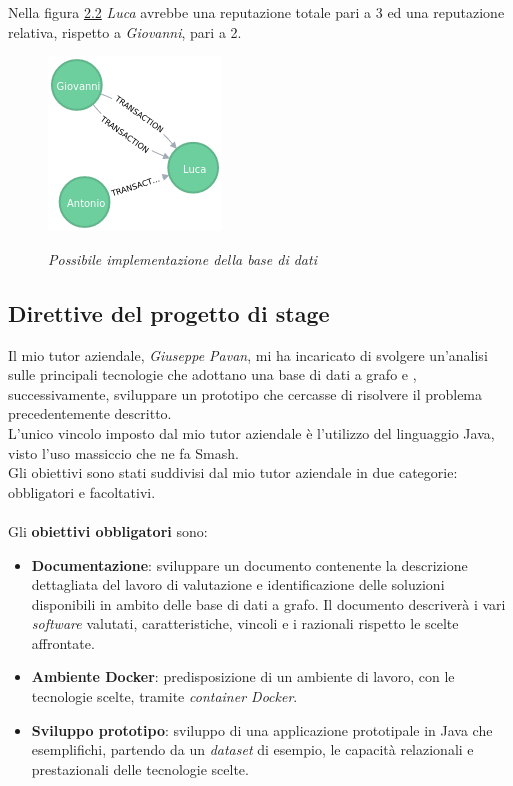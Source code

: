 Nella figura \hyperref[fig:figura 2.2]{2.2} \textit{Luca} avrebbe una reputazione totale pari a 3 ed una reputazione relativa, rispetto a \textit{Giovanni}, pari a 2.
\begin{figure}[h!]
	\centering
	\includegraphics[scale=0.8]{immagini/grafo1.png}
	\label{fig:figura 2.2}
	\caption{\textit{Possibile implementazione della base di dati}}
\end{figure}
\label{sec:pianodl}
\subsection{Direttive del progetto di stage}
Il mio tutor aziendale, \textit{Giuseppe Pavan}, mi ha incaricato di svolgere un'analisi sulle principali tecnologie che adottano una base di dati a grafo e , successivamente, sviluppare un prototipo che cercasse di risolvere il problema precedentemente descritto.\\
L'unico vincolo imposto dal mio tutor aziendale è l'utilizzo del linguaggio Java, visto l'uso massiccio che ne fa Smash\textregistered.\\
Gli obiettivi sono stati suddivisi dal mio tutor aziendale in due categorie: obbligatori e facoltativi.\\
\\
Gli \textbf{obiettivi obbligatori} sono:
\begin{itemize}
\item{\textbf{Documentazione}:} sviluppare un documento contenente la descrizione dettagliata del lavoro di valutazione e identificazione delle soluzioni disponibili in ambito delle base di dati a grafo. Il documento descriverà i vari \textit{software} valutati, caratteristiche, vincoli e i razionali rispetto le scelte affrontate.
\item{\textbf{Ambiente Docker}:} predisposizione di un ambiente di lavoro, con le tecnologie scelte, tramite \textit{container Docker}.
\item{\textbf{Sviluppo prototipo}:} sviluppo di una applicazione prototipale in Java che esemplifichi, partendo da un \textit{dataset} di esempio, le capacità relazionali e prestazionali delle tecnologie scelte.
\end{itemize}

